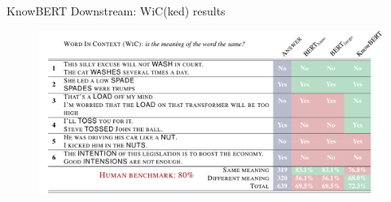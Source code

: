 
\begin{frame}{KnowBERT Downstream: WiC(ked) results }
    \begin{figure}
        \centering
        \includegraphics[width=1\textwidth]{graphics/appendix/wic_knowbert.png}
    \end{figure}    
\end{frame}